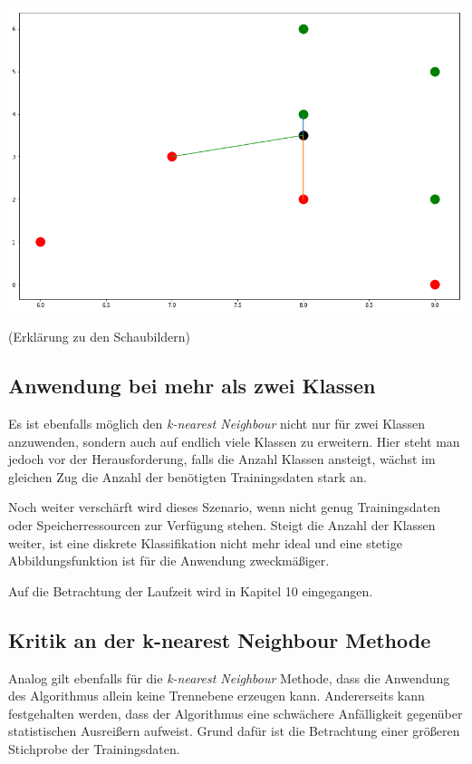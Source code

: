 \documentclass[fontsize=11pt]{scrartcl}
\newenvironment{Figure}
  {\par\medskip\noindent\minipage{\linewidth}}
  {\endminipage\par\medskip}
\begin{document}
\begin{Figure}
\begin{minipage}[b]{.4\linewidth}
                        \includegraphics[scale=0.2]{knn4.png}
                    \end{minipage}
                \end{Figure}     
                
                        
                (Erklärung zu den Schaubildern)
                        
            \subsection{Anwendung bei mehr als zwei Klassen}
                Es ist ebenfalls möglich den \emph{k-nearest Neighbour} nicht nur für zwei Klassen anzuwenden, sondern auch auf endlich viele Klassen zu erweitern. Hier steht man jedoch vor der Herausforderung, falls die Anzahl Klassen ansteigt, wächst im gleichen Zug die Anzahl der benötigten Trainingsdaten stark an.\cite{ertel2016_p211}\par
                Noch weiter verschärft wird dieses Szenario, wenn nicht genug Trainingsdaten oder Speicherressourcen zur Verfügung stehen. 
                Steigt die Anzahl der Klassen weiter, ist eine diskrete Klassifikation nicht mehr ideal und eine stetige Abbildungsfunktion ist für die Anwendung zweckmäßiger.\cite{ertel2016_p211}
                \par
                Auf die Betrachtung der Laufzeit wird in Kapitel 10 eingegangen.
                
            \subsection{Kritik an der k-nearest Neighbour Methode}
                Analog gilt ebenfalls für die \emph{k-nearest Neighbour} Methode, dass die Anwendung des Algorithmus allein keine Trennebene erzeugen kann.
                Andererseits kann festgehalten werden, dass der Algorithmus eine schwächere Anfälligkeit gegenüber statistischen Ausreißern aufweist. Grund dafür ist die Betrachtung einer größeren Stichprobe der Trainingsdaten.\par
                        
\end{document}
